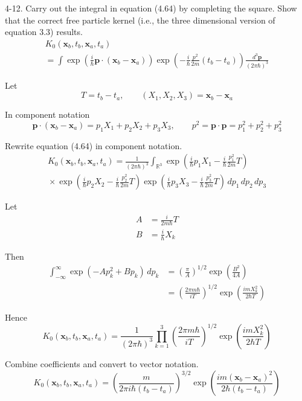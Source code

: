 \documentclass[12pt]{article}
\newcommand\INT{\int_{\mathbb R^3}}
\begin{document}
4-12.
Carry out the integral in equation (4.64) by completing the square.
Show that the correct free particle kernel
(i.e., the three dimensional version of equation 3.3) results.
\begin{multline*}
K_0(\mathbf x_b,t_b,\mathbf x_a,t_a)
\\
=\int
\exp\left(\frac{i}{\hbar}\mathbf p\cdot(\mathbf x_b-\mathbf x_a)\right)
\exp\left(-\frac{i}{\hbar}\frac{p^2}{2m}(t_b-t_a)\right)
\frac{d^3\mathbf p}{(2\pi\hbar)^3}
\tag{4.64}
\end{multline*}

Let
\begin{equation*}
T=t_b-t_a,
\qquad
(X_1,X_2,X_3)=\mathbf x_b-\mathbf x_a
\end{equation*}

In component notation
\begin{equation*}
\mathbf p\cdot(\mathbf x_b-\mathbf x_a)=p_1X_1+p_2X_2+p_3X_3,
\qquad
p^2=\mathbf p\cdot\mathbf p=p_1^2+p_2^2+p_3^2
\end{equation*}

Rewrite equation (4.64) in component notation.
\begin{multline*}
K_0(\mathbf x_b,t_b,\mathbf x_a,t_a)=\frac{1}{(2\pi\hbar)^3}\INT
\exp\left(\frac{i}{\hbar}p_1X_1-\frac{i}{\hbar}\frac{p_1^2}{2m}T\right)
\\
{}\times
\exp\left(\frac{i}{\hbar}p_2X_2-\frac{i}{\hbar}\frac{p_2^2}{2m}T\right)
\exp\left(\frac{i}{\hbar}p_3X_3-\frac{i}{\hbar}\frac{p_3^2}{2m}T\right)
\,dp_1\,dp_2\,dp_3
\end{multline*}

Let
\begin{align*}
A&=\frac{i}{2m\hbar}T
\\
B&=\frac{i}{\hbar}X_k
\end{align*}

Then
\begin{align*}
\int_{-\infty}^\infty\exp(-Ap_k^2+Bp_k)\,dp_k
&=\left(\frac{\pi}{A}\right)^{1/2}\exp\left(\frac{B^2}{4A}\right)
\\
&=\left(\frac{2\pi m\hbar}{iT}\right)^{1/2}
\exp\left(\frac{imX_k^2}{2\hbar T}\right)
\tag{1}
\end{align*}

Hence
\begin{equation*}
K_0(\mathbf x_b,t_b,\mathbf x_a,t_a)=
\frac{1}{(2\pi\hbar)^3}
\prod_{k=1}^3
\left(\frac{2\pi m\hbar}{iT}\right)^{1/2}
\exp\left(\frac{imX_k^2}{2\hbar T}\right)
\end{equation*}

Combine coefficients and convert to vector notation.
\begin{equation*}
K_0(\mathbf x_b,t_b,\mathbf x_a,t_a)=
\left(\frac{m}{2\pi i\hbar(t_b-t_a)}\right)^{3/2}
\exp\left(\frac{im(\mathbf x_b-\mathbf x_a)^2}{2\hbar(t_b-t_a)}\right)
\tag{2}
\end{equation*}
\end{document}
